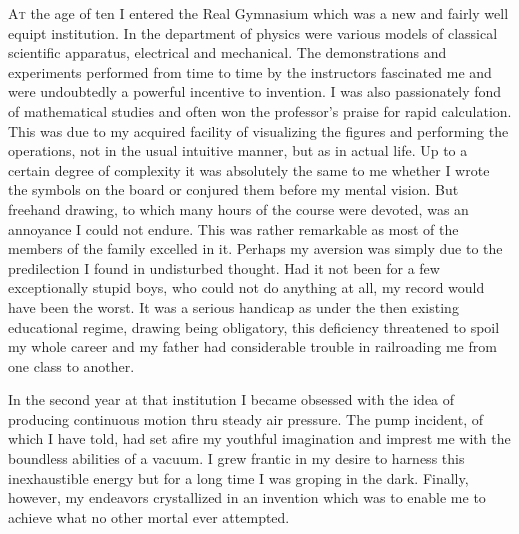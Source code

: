 \documentclass[a4paper,12pt,english,twoside,openright]{memoir}
\begin{document}
\lettrine[lines=3]{A}{t} the age of ten I entered the Real Gymnasium which was a new and fairly well equipt institution.  
In the department of physics were various models of classical scientific apparatus, electrical and 
mechanical.  The demonstrations and experiments performed from time to time by the instructors 
fascinated me and were undoubtedly a powerful incentive to invention.  I was also passionately 
fond of mathematical studies and often won the professor's praise for rapid calculation.  This was 
due to my acquired facility of visualizing the figures and performing the operations, not in the 
usual intuitive manner, but as in actual life.  Up to a certain degree of complexity it was absolutely 
the same to me whether I wrote the symbols on the board or conjured them before my mental 
vision.  But freehand drawing, to which many hours of the course were devoted, was an 
annoyance I could not endure.  This was rather remarkable as most of the members of the family 
excelled in it.  Perhaps my aversion was simply due to the predilection I found in undisturbed 
thought.  Had it not been for a few exceptionally stupid boys, who could not do anything at all, my 
record would have been the worst.  It was a serious handicap as under the then existing 
educational regime, drawing being obligatory, this deficiency threatened to spoil my whole career 
and my father had considerable trouble in railroading me from one class to another.  

In the second year at that institution I became obsessed with the idea of producing continuous 
motion thru steady air pressure.  The pump incident, of which I have told, had set afire my 
youthful imagination and imprest me with the boundless abilities of a vacuum.  I grew frantic in my 
desire to harness this inexhaustible energy but for a long time I was groping in the dark.  Finally, 
however, my endeavors crystallized in an invention which was to enable me to achieve what no 
other mortal ever attempted.  
\end{document}
